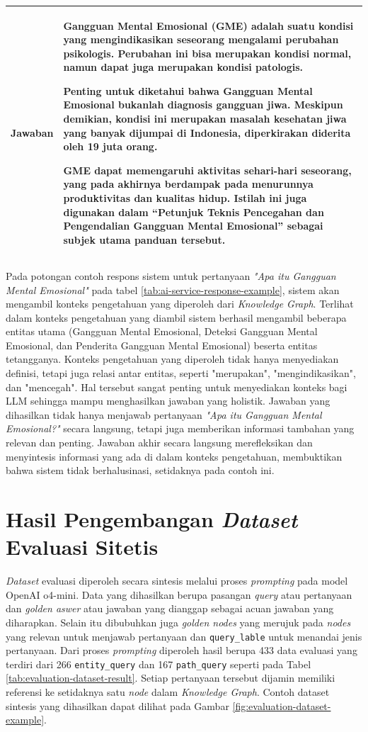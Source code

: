 \begin{longtable}{|p{}|p{}|}
	Jawaban                      &
	Gangguan Mental Emosional (GME) adalah suatu kondisi yang mengindikasikan seseorang mengalami perubahan psikologis. Perubahan ini bisa merupakan kondisi normal, namun dapat juga merupakan kondisi patologis.

	Penting untuk diketahui bahwa Gangguan Mental Emosional \textbf{bukanlah diagnosis gangguan jiwa}. Meskipun demikian, kondisi ini merupakan masalah kesehatan jiwa yang banyak dijumpai di Indonesia, diperkirakan diderita oleh 19 juta orang.

	GME dapat memengaruhi aktivitas sehari-hari seseorang, yang pada akhirnya berdampak pada menurunnya produktivitas dan kualitas hidup. Istilah ini juga digunakan dalam ``Petunjuk Teknis Pencegahan dan Pengendalian Gangguan Mental Emosional'' sebagai subjek utama panduan tersebut.
	\\
	\hline
\end{longtable}

Pada potongan contoh respons sistem untuk pertanyaan \textit{"Apa itu Gangguan Mental Emosional"} pada tabel \ref{tab:ai-service-response-example}, sistem akan mengambil konteks pengetahuan yang diperoleh dari \textit{Knowledge Graph}.
Terlihat dalam konteks pengetahuan yang diambil sistem berhasil mengambil beberapa entitas utama (Gangguan Mental Emosional, Deteksi Gangguan Mental Emosional, dan Penderita Gangguan Mental Emosional) beserta entitas tetangganya.
Konteks pengetahuan yang diperoleh tidak hanya menyediakan definisi, tetapi juga relasi antar entitas, seperti "merupakan", "mengindikasikan", dan "mencegah".
Hal tersebut sangat penting untuk menyediakan konteks bagi LLM sehingga mampu menghasilkan jawaban yang holistik.
Jawaban yang dihasilkan tidak hanya menjawab pertanyaan \textit{"Apa itu Gangguan Mental Emosional?"} secara langsung, tetapi juga memberikan informasi tambahan yang relevan dan penting.
Jawaban akhir secara langsung merefleksikan dan menyintesis informasi yang ada di dalam konteks pengetahuan, membuktikan bahwa sistem tidak berhalusinasi, setidaknya pada contoh ini.

\section{Hasil Pengembangan \textit{Dataset} Evaluasi Sitetis}
\textit{Dataset} evaluasi diperoleh secara sintesis melalui proses \textit{prompting} pada model OpenAI o4-mini.
Data yang dihasilkan berupa pasangan \textit{query} atau pertanyaan dan \textit{golden aswer} atau jawaban yang dianggap sebagai acuan jawaban yang diharapkan.
Selain itu dibubuhkan juga \textit{golden nodes} yang merujuk pada \textit{nodes} yang relevan untuk menjawab pertanyaan dan \texttt{query\_lable} untuk menandai jenis pertanyaan.
Dari proses \textit{prompting} diperoleh hasil berupa 433 data evaluasi yang terdiri dari 266 \texttt{entity\_query} dan 167 \texttt{path\_query} seperti pada Tabel \ref{tab:evaluation-dataset-result}.
Setiap pertanyaan tersebut dijamin memiliki referensi ke setidaknya satu \textit{node} dalam \textit{Knowledge Graph}.
Contoh dataset sintesis yang dihasilkan dapat dilihat pada Gambar \ref{fig:evaluation-dataset-example}.

